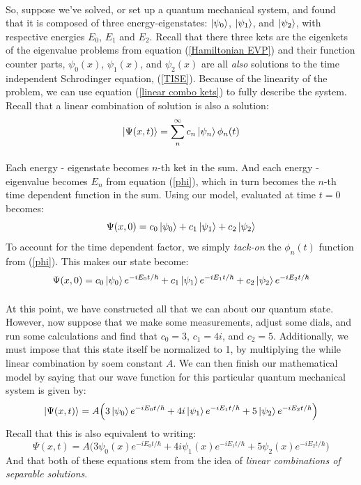 \documentclass[12pt,letterpaper]{book}
\begin{document}
\paragraph*{}So, suppose we've solved, or set up a quantum mechanical system, and found that it is composed of three energy-eigenstates: 
$\ket{\psi_0}$, $\ket{\psi_1}$, and $\ket{\psi_2}$, with respective energies $E_0$, $E_1$ and $E_2$.  Recall that there three kets are the eigenkets of the eigenvalue problems from equation (\ref{Hamiltonian EVP}) and their function counter parts, $\psi_0(x)$, $\psi_1(x)$, and $\psi_2(x)$ are all \textit{also} solutions to the time independent Schrodinger equation, (\ref{TISE}). Because of the linearity of the problem, we can use equation (\ref{linear combo kets}) to fully describe the system. Recall that a linear combination of solution is also a solution:
\begin{equation}
\ket{\Psi(x,t)} = \sum_n^{\infty} c_n \ket{\psi_n} \phi_n(t)
\end{equation}
\paragraph*{}Each energy - eigenstate becomes $n$-th ket in the sum. And each energy - eigenvalue becomes $E_n$ from equation (\ref{phi}), which in turn becomes the $n$-th time dependent function in the sum. Using our model, evaluated at time $t=0$ becomes:
\begin{equation}
\Psi(x,0) = c_0 \ket{\psi_0} + c_1 \ket{\psi_1} + c_2 \ket{\psi_2} 
\end{equation}
To account for the time dependent factor, we simply \textit{tack-on} the $\phi_n(t)$ function from (\ref{phi}). This makes our state become:
\begin{equation}
\Psi(x,0) = c_0 \ket{\psi_0}e^{-iE_0t/\hbar} + c_1 \ket{\psi_1}e^{-iE_1t/\hbar} + c_2 \ket{\psi_2} e^{-iE_2t/\hbar}
\end{equation}
\paragraph*{}At this point, we have constructed all that we can about our quantum state. However, now suppose that we make some measurements, adjust some dials, and run some calculations and find that $c_0 = 3$, $c_1 = 4i$, and $c_2 = 5$. Additionally, we must impose that this state itself be normalized to 1, by multiplying the while linear combination by soem constant $A$. We can then finish our mathematical model  by saying that our wave function for this particular quantum mechanical system is given by:
\begin{equation}
\label{ex1 sys ket dirac}
\ket{\Psi(x,t)} = A \Big( 3 \ket{\psi_0}e^{-iE_0t/\hbar} + 4i \ket{\psi_1}e^{-iE_1t/\hbar} + 5 \ket{\psi_2} e^{-iE_2t/\hbar} \Big)
\end{equation}
Recall that this is also equivalent to writing:
\begin{equation}
\label{ex1 sys non-dirac}
\Psi(x,t) =  A \Big( 3\psi_0(x)e^{-iE_0t/\hbar} + 4i\psi_1(x)e^{-iE_1t/\hbar} + 5\psi_2(x)e^{-iE_2t/\hbar} \Big)
\end{equation}
And that both of these equations stem from the idea of \textit{linear combinations of separable solutions}.
\end{document}
